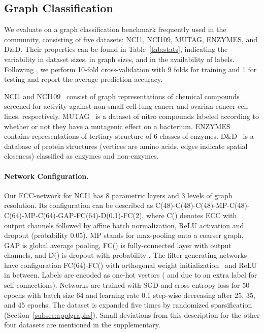 \documentclass[10pt,twocolumn,letterpaper]{article}
\begin{document}
\subsection{Graph Classification} \label{subsec:evalgg}

We evaluate on a graph classification benchmark frequently used in the community, consisting of five datasets: NCI1, NCI109, MUTAG, ENZYMES, and D{\&}D. Their properties can be found in Table~\ref{tab:stats}, indicating the variability in dataset sizes, in graph sizes, and in the availability of labels. Following \cite{shervashidze}, we perform 10-fold cross-validation with 9 folds for training and 1 for testing and report the average prediction accuracy.

NCI1 and NCI109~\cite{nci1db} consist of graph representations of chemical compounds screened for activity against non-small cell lung cancer and ovarian cancer cell lines, respectively. MUTAG~\cite{debnath1991structure} is a dataset of nitro compounds labeled according to whether or not they have a mutagenic effect on a bacterium. ENZYMES~\cite{borgwardtK05} contains representations of tertiary structure of 6 classes of enzymes. D{\&}D~\cite{dobson2003} is a database of protein structures (vertices are amino acids, edges indicate spatial closeness) classified as enzymes and non-enzymes. 

\paragraph*{Network Configuration.}
Our ECC-network for NCI1 has 8 parametric layers and 3 levels of graph resolution. Its configuration can be described as C(48)-C(48)-C(48)-MP-C(48)-C(64)-MP-C(64)-GAP-FC(64)-D(0.1)-FC(2), where C() denotes ECC with  output channels followed by affine batch normalization, ReLU activation and dropout (probability 0.05), MP stands for max-pooling onto a coarser graph, GAP is global average pooling, FC() is fully-connected layer with  output channels, and D() is dropout with probability . The filter-generating networks  have configuration FC(64)-FC() with orthogonal weight initialization~\cite{orthoinit} and ReLU in between. Labels are encoded as one-hot vectors ( and  due to an extra label for self-connections). Networks are trained with SGD and cross-entropy loss for 50 epochs with batch size 64 and learning rate 0.1 step-wise decreasing after 25, 35, and 45 epochs. The dataset is expanded five times by randomized sparsification (Section~\ref{subsec:applgraphs}). Small deviations from this description for the other four datasets are mentioned in the supplementary.
\end{document}
